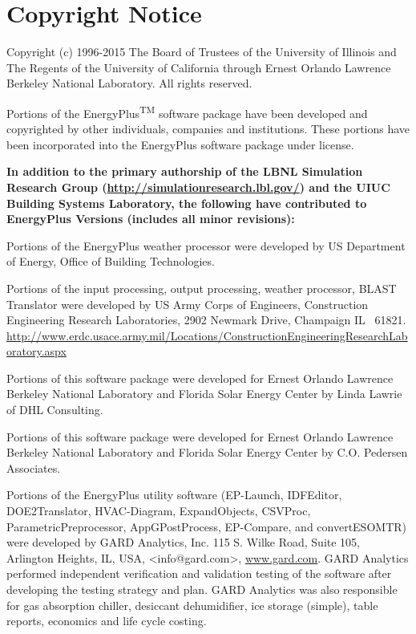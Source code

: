 \section{Copyright Notice}\label{copyright-notice}

Copyright (c) 1996-2015 The Board of Trustees of the University of Illinois and The Regents of the University of California through Ernest Orlando Lawrence Berkeley National Laboratory. All rights reserved.

Portions of the EnergyPlus\textsuperscript{TM} software package have been developed and copyrighted by other individuals, companies and institutions. These portions have been incorporated into the EnergyPlus software package under license.

\textbf{In addition to the primary authorship of the LBNL Simulation Research Group (}\href{http://simulationresearch.lbl.gov/}{\textbf{http://simulationresearch.lbl.gov/}}\textbf{) and the UIUC Building Systems Laboratory, the following have contributed to EnergyPlus Versions (includes all minor revisions):}

Portions of the EnergyPlus weather processor were developed by US Department of Energy, Office of Building Technologies.

Portions of the input processing, output processing, weather processor, BLAST Translator were developed by US Army Corps of Engineers, Construction Engineering Research Laboratories, 2902 Newmark Drive, Champaign IL~ 61821. \url{http://www.erdc.usace.army.mil/Locations/ConstructionEngineeringResearchLaboratory.aspx}

Portions of this software package were developed for Ernest Orlando Lawrence Berkeley National Laboratory and Florida Solar Energy Center by Linda Lawrie of DHL Consulting.

Portions of this software package were developed for Ernest Orlando Lawrence Berkeley National Laboratory and Florida Solar Energy Center by C.O. Pedersen Associates.

Portions of the EnergyPlus utility software (EP-Launch, IDFEditor, DOE2Translator, HVAC-Diagram, ExpandObjects, CSVProc, ParametricPreprocessor, AppGPostProcess, EP-Compare, and convertESOMTR) were developed by GARD Analytics, Inc. 115 S. Wilke Road, Suite 105, Arlington Heights, IL, USA, \textless{}info@gard.com\textgreater{}, \href{http://www.gard.com/}{www.gard.com}. GARD Analytics performed independent verification and validation testing of the software after developing the testing strategy and plan. GARD Analytics was also responsible for gas absorption chiller, desiccant dehumidifier, ice storage (simple), table reports, economics and life cycle costing.

